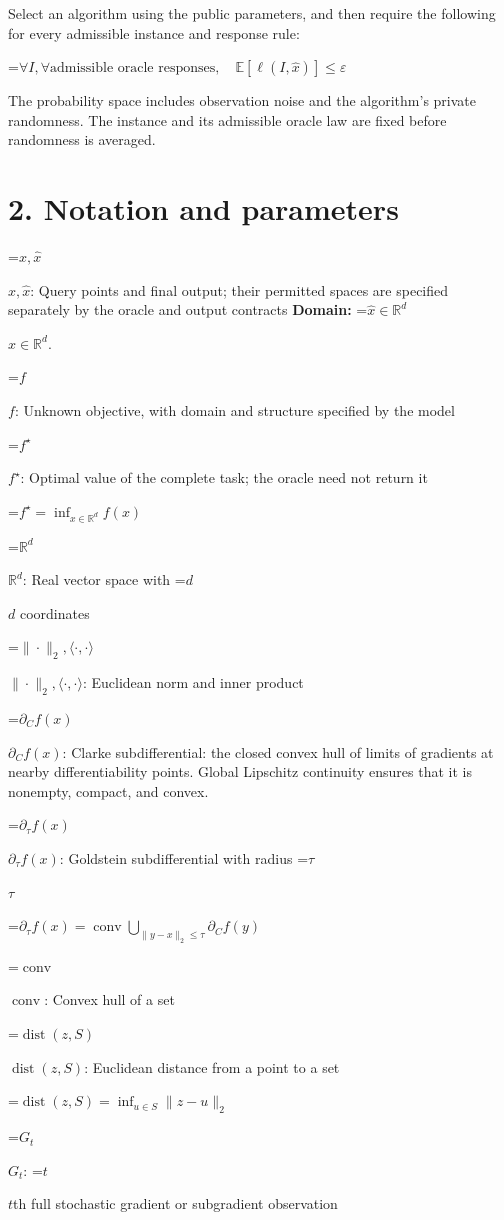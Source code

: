 \documentclass[10pt,a4paper]{article}
\newcommand{\AtlasMath}[1]{\par\begingroup\centering\setbox0=\hbox{$\displaystyle #1$}\ifdim\wd0>1.4\linewidth\typeout{ATLAS WIDE FORMULA: \the\wd0}\fi\ifdim\wd0>\linewidth\resizebox{\linewidth}{!}{\box0}\else\box0\fi\par\endgroup}
\newcommand{\AtlasInlineMath}[1]{\begingroup\setbox0=\hbox{$#1$}\ifdim\wd0>.4\linewidth\endgroup\AtlasMath{#1}\else\endgroup$#1$\fi}
\begin{document}
Select an algorithm using the public parameters, and then require the following for every admissible instance and response rule:


\AtlasMath{\forall I,\forall\text{admissible oracle responses},\quad\mathbb{E}[\ell(I,\widehat{x})]\le\varepsilon}


The probability space includes observation noise and the algorithm's private randomness. The instance and its admissible oracle law are fixed before randomness is averaged.

\section{2. Notation and parameters}
\AtlasInlineMath{x,\widehat{x}}: Query points and final output; their permitted spaces are specified separately by the oracle and output contracts \textbf{Domain:} \AtlasInlineMath{\widehat{x}\in \mathbb{R}^d}.

\AtlasInlineMath{f}: Unknown objective, with domain and structure specified by the model

\AtlasInlineMath{f^\star}: Optimal value of the complete task; the oracle need not return it


\AtlasMath{f^\star=\inf_{x\in \mathbb{R}^d}f(x)}


\AtlasInlineMath{\mathbb{R}^d}: Real vector space with \AtlasInlineMath{d} coordinates

\AtlasInlineMath{\|\cdot\|_2,\langle\cdot,\cdot\rangle}: Euclidean norm and inner product

\AtlasInlineMath{\partial_C f(x)}: Clarke subdifferential: the closed convex hull of limits of gradients at nearby differentiability points. Global Lipschitz continuity ensures that it is nonempty, compact, and convex.

\AtlasInlineMath{\partial_\tau f(x)}: Goldstein subdifferential with radius \AtlasInlineMath{\tau}


\AtlasMath{\partial_\tau f(x)=\operatorname{conv}\bigcup_{\|y-x\|_2\le\tau}\partial_C f(y)}


\AtlasInlineMath{\operatorname{conv}}: Convex hull of a set

\AtlasInlineMath{\operatorname{dist}(z,S)}: Euclidean distance from a point to a set


\AtlasMath{\operatorname{dist}(z,S)=\inf_{u\in S}\|z-u\|_2}


\AtlasInlineMath{G_t}: \AtlasInlineMath{t}th full stochastic gradient or subgradient observation
\end{document}
